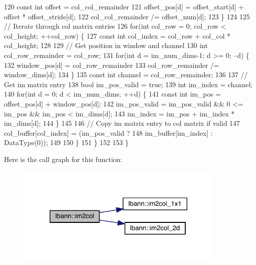 \begin{DoxyCode}
120       \textcolor{keyword}{const} \textcolor{keywordtype}{int} offset = col\_col\_remainder %
121       offset\_pos[d] = offset\_start[d] + offset * offset\_stride[d];
122       col\_col\_remainder /= offset\_num[d];
123     \}
124 
125     \textcolor{comment}{// Iterate through col matrix entries}
126     \textcolor{keywordflow}{for}(\textcolor{keywordtype}{int} col\_row = 0; col\_row < col\_height; ++col\_row) \{
127       \textcolor{keyword}{const} \textcolor{keywordtype}{int} col\_index = col\_row + col\_col * col\_height;
128 
129       \textcolor{comment}{// Get position in window and channel}
130       \textcolor{keywordtype}{int} col\_row\_remainder = col\_row;
131       \textcolor{keywordflow}{for}(\textcolor{keywordtype}{int} d = im\_num\_dims-1; d >= 0; --d) \{
132         window\_pos[d] = col\_row\_remainder %
133         col\_row\_remainder /= window\_dims[d];
134       \}
135       \textcolor{keyword}{const} \textcolor{keywordtype}{int} channel = col\_row\_remainder;
136 
137       \textcolor{comment}{// Get im matrix entry}
138       \textcolor{keywordtype}{bool} im\_pos\_valid = \textcolor{keyword}{true};
139       \textcolor{keywordtype}{int} im\_index = channel;
140       \textcolor{keywordflow}{for}(\textcolor{keywordtype}{int} d = 0; d < im\_num\_dims; ++d) \{
141         \textcolor{keyword}{const} \textcolor{keywordtype}{int} im\_pos = offset\_pos[d] + window\_pos[d];
142         im\_pos\_valid = im\_pos\_valid && 0 <= im\_pos && im\_pos < im\_dims[d];
143         im\_index = im\_pos + im\_index * im\_dims[d];
144       \}
145 
146       \textcolor{comment}{// Copy im matrix entry to col matrix if valid}
147       col\_buffer[col\_index] = (im\_pos\_valid ?
148                                im\_buffer[im\_index] : DataType(0));
149 
150     \}
151   \}
152 
153 \}
\end{DoxyCode}
Here is the call graph for this function\+:\nopagebreak
\begin{figure}[H]
\begin{center}
\leavevmode
\includegraphics[width=288pt]{namespacelbann_aa3636a1979e40da2af91f30a12b90db9_cgraph}
\end{center}
\end{figure}
